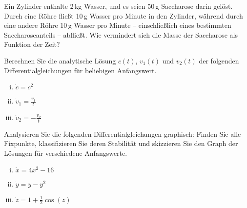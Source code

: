 \documentclass[11pt,a4paper]{article}
\begin{document}




\begin{aufg}
 Ein Zylinder enthalte 2\,kg Wasser, und es seien 50\,g Saccharose darin
 gelöst. Durch eine Röhre fließt 10\,g Wasser pro Minute in den Zylinder,
 während durch eine andere Röhre 10\,g Wasser pro Minute -- einschließlich eines
 bestimmten Saccharoseanteils -- abfließt. Wie vermindert sich die Masse der
 Saccharose als Funktion der Zeit?
\end{aufg}

\bigskip%

\begin{aufg}
 Berechnen Sie die analytische Lösung $c(t)$, $v_1(t)$ und $v_2(t)$ der
 folgenden Differentialgleichungen
 für beliebigen Anfangswert.
  \begin{enumerate}[(i)]
  \item $\dot{c}=c^2$
  \item $\dot{v}_1=\frac{v_1}{t}$
  \item $\dot{v}_2=-\frac{v_2}{t}$
 \end{enumerate}
\end{aufg}

\bigskip%

\begin{aufg}
 Analysieren Sie die folgenden Differentialgleichungen graphisch: Finden Sie
 alle Fixpunkte, klassifizieren Sie deren Stabilität und skizzieren Sie den
 Graph der Lösungen für verschiedene Anfangswerte.
 \begin{enumerate}[(i)]
  \item $\dot{x}=4x^2 - 16$
  \item $\dot{y}=y - y^2$
  \item $\dot{z}=1 + \frac{1}{2}\cos(z)$
 \end{enumerate}
\end{aufg}
\end{document}
